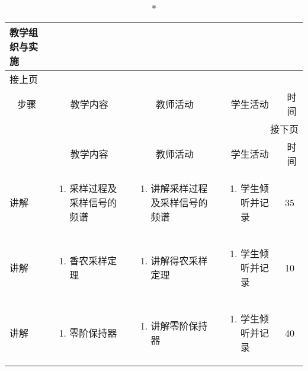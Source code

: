 {%
\begin{landscape}

\begin{longtable}{|m{10mm}|m{50mm}|m{50mm}|m{50mm}|m{15mm}|}
\caption*{\huge 教学组织与实施}\\
\hline
\endfirsthead
\multicolumn{5}{l}{\small 接上页}\\
\hline
\multicolumn{1}{|c|}{步骤}&\multicolumn{1}{c|}{教学内容}&\multicolumn{1}{c|}{教师活动}&\multicolumn{1}{c|}{学生活动}&\multicolumn{1}{c|}{时间}\\
\hline
\endhead

\multicolumn{5}{r}{\small 接下页}\\
\endfoot
\hline
\endlastfoot
\multicolumn{1}{|c|}{步骤}&\multicolumn{1}{c|}{教学内容}&\multicolumn{1}{c|}{教师活动}&\multicolumn{1}{c|}{学生活动}&\multicolumn{1}{c|}{时间}\\\hline
讲解&\begin{enumerate}
\item 采样过程及采样信号的频谱
\end{enumerate} &\begin{enumerate}
\item 讲解采样过程及采样信号的频谱
\end{enumerate} &\begin{enumerate}
\item 学生倾听并记录
\end{enumerate} &35\\\hline
讲解&\begin{enumerate}
\item 香农采样定理
\end{enumerate}
 &\begin{enumerate}
\item 讲解得农采样定理
\end{enumerate} &\begin{enumerate}
\item 学生倾听并记录
\end{enumerate} &10 \\\hline
讲解&\begin{enumerate}
\item 零阶保持器
\end{enumerate}
&\begin{enumerate}
\item 讲解零阶保持器
\end{enumerate} &\begin{enumerate}
\item 学生倾听并记录
\end{enumerate} &40 \\\hline


\end{longtable}
\end{landscape}}
